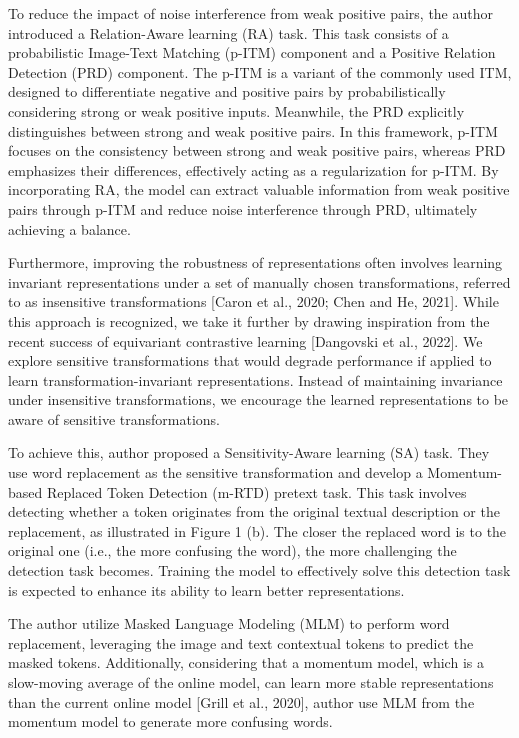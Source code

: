 To reduce the impact of noise interference from weak positive pairs, the author introduced a Relation-Aware learning (RA) task. This task consists of a probabilistic Image-Text Matching (p-ITM) component and a Positive Relation Detection (PRD) component. The p-ITM is a variant of the commonly used ITM, designed to differentiate negative and positive pairs by probabilistically considering strong or weak positive inputs. Meanwhile, the PRD explicitly distinguishes between strong and weak positive pairs. In this framework, p-ITM focuses on the consistency between strong and weak positive pairs, whereas PRD emphasizes their differences, effectively acting as a regularization for p-ITM. By incorporating RA, the model can extract valuable information from weak positive pairs through p-ITM and reduce noise interference through PRD, ultimately achieving a balance.

Furthermore, improving the robustness of representations often involves learning invariant representations under a set of manually chosen transformations, referred to as insensitive transformations [Caron et al., 2020; Chen and He, 2021]. While this approach is recognized, we take it further by drawing inspiration from the recent success of equivariant contrastive learning [Dangovski et al., 2022]. We explore sensitive transformations that would degrade performance if applied to learn transformation-invariant representations. Instead of maintaining invariance under insensitive transformations, we encourage the learned representations to be aware of sensitive transformations. 

To achieve this, author proposed a Sensitivity-Aware learning (SA) task. They use word replacement as the sensitive transformation and develop a Momentum-based Replaced Token Detection (m-RTD) pretext task. This task involves detecting whether a token originates from the original textual description or the replacement, as illustrated in Figure 1 (b). The closer the replaced word is to the original one (i.e., the more confusing the word), the more challenging the detection task becomes. Training the model to effectively solve this detection task is expected to enhance its ability to learn better representations.

The author utilize Masked Language Modeling (MLM) to perform word replacement, leveraging the image and text contextual tokens to predict the masked tokens. Additionally, considering that a momentum model, which is a slow-moving average of the online model, can learn more stable representations than the current online model [Grill et al., 2020], author use MLM from the momentum model to generate more confusing words. 

